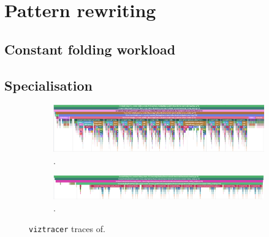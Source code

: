 \section{Pattern rewriting}
\label{sec:specialising-pattern-rewriting}


\subsection{Constant folding workload}
\label{sec:specialising-pattern-rewriting-workload}




\subsection{Specialisation}
\label{sec:specialising-pattern-rewriting-specialisation}



\begin{figure}[H]
    \centering
    \begin{subfigure}[b]{\textwidth}
        \centering
        \includegraphics[width=\textwidth]{images/specialising_optimising_xdsl_rewriting/custom_constant_fold.png}
        \captionsetup{width=0.8\textwidth}
        \caption{.}
        \label{fig:constant-fold-original-viztracer}
    \end{subfigure}
    \begin{subfigure}[b]{\textwidth}
        \centering
        \includegraphics[width=\textwidth]{images/specialising_optimising_xdsl_rewriting/optimised_constant_fold.png}
        \captionsetup{width=0.8\textwidth}
        \caption{.}
        \label{fig:constant-fold-optimised-viztracer}
    \end{subfigure}
    \caption{\texttt{viztracer} traces of.}
    \label{fig:constant-fold-viztracer}
\end{figure}

